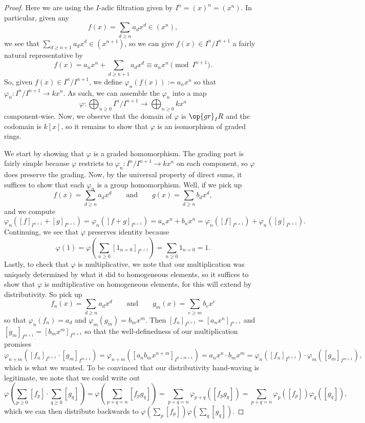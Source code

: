 \begin{proof}
	Here we are using the $I$-adic filtration given by $I^n=(x)^n=\left(x^n\right)$. In particular, given any
	\[f(x)=\sum_{d\ge n}a_dx^d\in\left(x^n\right),\]
	we see that $\sum_{d\ge n+1}a_dx^d\in\left(x^{n+1}\right)$, so we can give $f(x)\in I^n/I^{n+1}$ a fairly natural representative by
	\[f(x)=a_nx^n+\sum_{d\ge n+1}a_dx^d\equiv a_nx^n\pmod{I^{n+1}}.\]
	So, given $f(x)\in I^n/I^{n+1}$, we define $\varphi_n(f(x)):=a_nx^n$ so that $\varphi_n:I^n/I^{n+1}\to kx^n$. As such, we can assemble the $\varphi_n$ into a map
	\[\varphi:\bigoplus_{n\ge0}I^n/I^{n+1}\to\bigoplus_{n\ge0}kx^n\]
	component-wise. Now, we observe that the domain of $\varphi$ is $\op{gr}_IR$ and the codomain is $k[x]$, so it remains to show that $\varphi$ is an isomorphism of graded rings.

	We start by showing that $\varphi$ is a graded homomorphism. The grading part is fairly simple because $\varphi$ restricts to $\varphi_n:I^n/I^{n+1}\to kx^n$ on each component, so $\varphi$ does preserve the grading. Now, by the universal property of direct sums, it suffices to show that each $\varphi_n$ is a group homomorphism. Well, if we pick up
	\[f(x)=\sum_{d\ge n}a_dx^d\qquad\text{and}\qquad g(x)=\sum_{d\ge n}b_dx^d,\]
	and we compute
	\[\varphi_n\left([f]_{I^{n+1}}+[g]_{I^{n+1}}\right)=\varphi_n\left([f+g]_{I^{n+1}}\right)=a_nx^n+b_nx^n=\varphi_n\left([f]_{I^{n+1}}\right)+\varphi_n\left([g]_{I^{n+1}}\right).\]
	Continuing, we see that $\varphi$ preserves identity because
	\[\varphi(1)=\varphi\left(\sum_{n\ge0}[1_{n=0}]_{I^{n+1}}\right)=\sum_{n\ge0}1_{n=0}=1.\]
	Lastly, to check that $\varphi$ is multiplicative, we note that our multiplication was uniquely determined by what it did to homogeneous elements, so it suffices to show that $\varphi$ is multiplicative on homogeneous elements, for this will extend by distributivity. So pick up
	\[f_n(x)=\sum_{d\ge n}a_dx^d\qquad\text{and}\qquad g_m(x)=\sum_{e\ge m}b_ex^e\]
	so that $\varphi_n(f_n)=a_d$ and $\varphi_m(g_m)=b_mx^m$. Then $[f_n]_{I^{n+1}}=\left[a_nx^n\right]_{I^{n+1}}$ and $[g_m]_{I^{m+1}}=\left[b_mx^m\right]_{I^{m+1}}$ so that the well-definedness of our multiplication promises
	\[\varphi_{n+m}\left([f_n]_{I^{n+1}}\cdot[g_m]_{I^{m+1}}\right)=\varphi_{n+m}\left([a_nb_mx^{n+m}]_{I^{n+m+1}}\right)=a_nx^n\cdot b_mx^m=\varphi_n\left([f_n]_{I^{n+1}}\right)\cdot\varphi_m\left([g_m]_{I^{m+1}}\right),\]
	which is what we wanted. To be convinced that our distributivity hand-waving is legitimate, we note that we could write out
	\[\varphi\left(\sum_{p\ge0}[f_p]\cdot\sum_{q\ge0}[g_q]\right)=\varphi\left(\sum_{p+q=n}[f_pg_q]\right)=\sum_{p+q=n}\varphi_{p+q}([f_pg_q])=\sum_{p+q=n}\varphi_p([f_p])\varphi_q([g_q]),\]
	which we can then distribute backwards to $\varphi\left(\sum_p[f_p]\right)\varphi\left(\sum_q[g_q]\right)$.


\end{proof}
